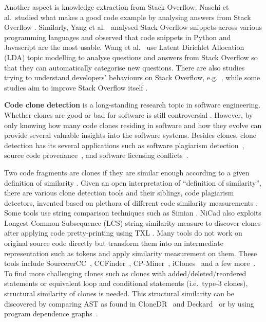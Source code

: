 \documentclass[sigconf,review, anonymous]{acmart}
\begin{document}
Another aspect is knowledge extraction from Stack Overflow. Nasehi et al.~studied what makes a good code example by analysing answers from Stack Overflow \cite{Nasehi2012}. Similarly, Yang et al.~\cite{Yang2016} analysed Stack Overflow snippets across various programming languages and observed that code snippets in Python and Javascript are the most usable. Wang et al.~\cite{Wang2013_StackOverflow} use Latent Dirichlet Allocation (LDA) topic modelling to analyse questions and answers from Stack Overflow so that they can automatically categorise new questions. There are also studies trying to understand developers' behaviours on Stack Overflow, e.g.~\cite{Movshovitz-Attias2013,Rosen2016,Choetkiertikul2015,Bosu2013}, while some studies aim to improve Stack Overflow itself \cite{Diamantopoulos2015, Wang2014}. 

\textbf{Code clone detection} is a long-standing research topic in software engineering. Whether clones are good or bad for software is still controversial \cite{Sajnani2016,Kapser2003,Kapser2008,Krinke2008,Hotta2010,Gode2011,Harder2013}. However, by only knowing how many code clones residing in software and how they evolve \cite{Pate2013,Mondal2011} can provide several valuable insights into the software systems. Besides clones, clone detection has its several applications such as software plagiarism detection~\cite{Prechelt2002}, 
source code provenance~\cite{Davies2013}, and software licensing conflicts~\cite{German2009}.

Two code fragments are clones if they are similar enough according to a given definition of similarity \cite{Bellon2007}. Given an open interpretation of ``definition of similarity'', there are various clone detection tools and their siblings, code plagiarism detectors, invented based on plethora of different code similarity measurements \cite{Roy2008, Ragkhitwetsagul2016,Svajlenko2014}. Some tools
use string comparison techniques such as Simian \cite{simian}. NiCad \cite{Roy2008,Cordy} also exploits Longest Common Subsequence (LCS) string similarity measure to discover clones after applying code pretty-printing using TXL \cite{Cordy2006}. Many tools do not work on original source code directly but transform them into an
intermediate representation such as tokens and apply similarity
measurement on them. These tools include SourcererCC~\cite{Sajnani2016}, CCFinder~\cite{Kamiya2002},
CP-Miner~\cite{Li2006}, iClones~\cite{Gode2009} and a few more~\cite{Burrows2007, Smith2009, Duric2012, Prechelt2002, Schleimer2003}. 
To find more challenging clones such as clones with added/deleted/reordered statements or equivalent loop and conditional statements (i.e.~type-3 clones), structural similarity of clones is needed.
This structural similarity can be discovered by comparing AST as found in CloneDR~\cite{Baxter1998} and Deckard~\cite{Jiang2007a} or by using program dependence
graphs~\cite{Krinke2001,Komondoor2001}. 
\end{document}
